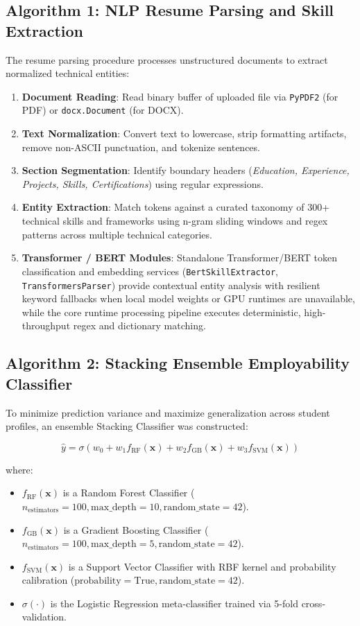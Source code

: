 \documentclass[12pt,a4paper]{report}
\begin{document}
\subsection{Algorithm 1: NLP Resume Parsing and Skill Extraction}
The resume parsing procedure processes unstructured documents to extract normalized technical entities:

\begin{enumerate}
    \item \textbf{Document Reading}: Read binary buffer of uploaded file via \texttt{PyPDF2} (for PDF) or \texttt{docx.Document} (for DOCX).
    \item \textbf{Text Normalization}: Convert text to lowercase, strip formatting artifacts, remove non-ASCII punctuation, and tokenize sentences.
    \item \textbf{Section Segmentation}: Identify boundary headers (\textit{Education, Experience, Projects, Skills, Certifications}) using regular expressions.
    \item \textbf{Entity Extraction}: Match tokens against a curated taxonomy of 300+ technical skills and frameworks using n-gram sliding windows and regex patterns across multiple technical categories.
    \item \textbf{Transformer / BERT Modules}: Standalone Transformer/BERT token classification and embedding services (\texttt{BertSkillExtractor}, \texttt{TransformersParser}) provide contextual entity analysis with resilient keyword fallbacks when local model weights or GPU runtimes are unavailable, while the core runtime processing pipeline executes deterministic, high-throughput regex and dictionary matching.
\end{enumerate}

\subsection{Algorithm 2: Stacking Ensemble Employability Classifier}
To minimize prediction variance and maximize generalization across student profiles, an ensemble Stacking Classifier was constructed:

\begin{equation}
    \hat{y} = \sigma \left( w_0 + w_1 f_{\text{RF}}(\mathbf{x}) + w_2 f_{\text{GB}}(\mathbf{x}) + w_3 f_{\text{SVM}}(\mathbf{x}) \right)
\end{equation}

\noindent where:
\begin{itemize}
    \item $f_{\text{RF}}(\mathbf{x})$ is a Random Forest Classifier ($n_{\text{estimators}}=100, \text{max\_depth}=10, \text{random\_state}=42$).
    \item $f_{\text{GB}}(\mathbf{x})$ is a Gradient Boosting Classifier ($n_{\text{estimators}}=100, \text{max\_depth}=5, \text{random\_state}=42$).
    \item $f_{\text{SVM}}(\mathbf{x})$ is a Support Vector Classifier with RBF kernel and probability calibration ($\text{probability}=\text{True}, \text{random\_state}=42$).
    \item $\sigma(\cdot)$ is the Logistic Regression meta-classifier trained via 5-fold cross-validation.
\end{itemize}
\end{document}

